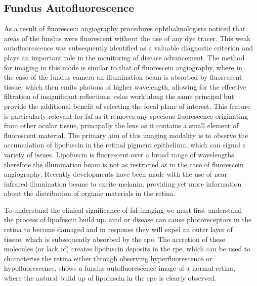 \subsection{Fundus Autofluorescence}

As a result of fluorescein angiography procedures ophthalmologists noticed
that areas of the fundus were fluorescent without the use of any dye tracer.
This weak autofluorescence was subsequently identified as a valuable diagnostic
criterion and plays an important role in the monitoring of disease advancement.
The method for imaging in this mode is similar to that of fluorescein angiography,
where in the case of the fundus camera an illumination beam is absorbed by
fluorescent tissue, which then emits photons of higher wavelength, allowing
for the effective filtration of insignificant reflections. \gls{cslo}s work along
the same principal but provide the additional benefit of selecting the focal
plane of interest.\cite{schmitz2008fundus} This feature is particularly relevant
for \Gls{faf} as it removes any specious fluorescence originating
from other ocular tissue, principally the lens as it contains a small element of
fluorescent material. \cite{von1995distribution} The primary aim of this imaging
modality is to observe the accumulation of lipofuscin in the retinal pigment
epithelium, which can signal a variety of issues. Lipofuscin is fluorescent over
a broad range of wavelengths therefore the illumination beam is not as restricted
as in the case of fluorescein angiography. Recently developments have been made
with the use of near infrared illumination beams to excite melanin, providing
yet more information about the distribution of organic materials in the retina.

To understand the clinical significance of \gls{faf} imaging we must first understand
the process of lipofuscin build up.\cite{kennedy1995lipofuscin} \Gls{amd} or disease can cause photoreceptors in the retina to become
damaged and in response they will expel an outer layer of tissue, which is
subsequently absorbed by the \Gls{rpe}.\cite{spaide2003fundus}
The accretion of these molecules (or lack of) creates lipofuscin deposits
in the \Gls{rpe}, which can be used to characterise the retina either through
observing hyperfluorescence or hypofluorescence.  shows a
fundus autofluorescence image of a normal retina, where the natural
build up of lipofuscin in the \Gls{rpe} is clearly observed.

